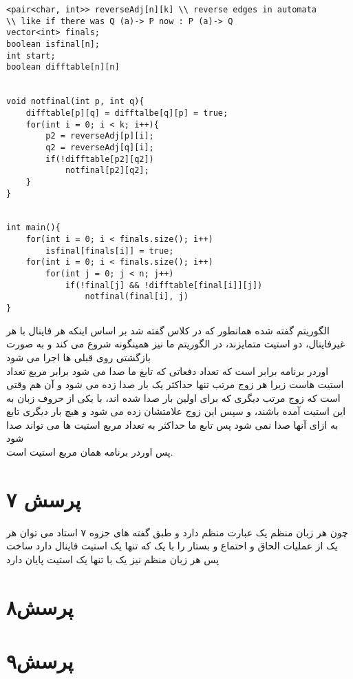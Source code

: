 \documentclass[a4paper]{article}
\begin{document}
	\lstset{ basicstyle=\footnotesize\tt, %
	captionpos=b, %
	extendedchars=true, %
	frame=single, %
	language=Java, %
	keywordstyle=\bf, 
	showspaces=false, %
	showtabs=false, %
tabsize=2 %
}
\begin{latin}
\begin{lstlisting}
<pair<char, int>> reverseAdj[n][k] \\ reverse edges in automata
\\ like if there was Q (a)-> P now : P (a)-> Q
vector<int> finals;
boolean isfinal[n];
int start;
boolean difftable[n][n]


void notfinal(int p, int q){
	difftable[p][q] = difftalbe[q][p] = true;
	for(int i = 0; i < k; i++){
		p2 = reverseAdj[p][i];
		q2 = reverseAdj[q][i];
		if(!difftable[p2][q2])
			notfinal[p2][q2];
	}
}


int main(){
	for(int i = 0; i < finals.size(); i++)
		isfinal[finals[i]] = true;
	for(int i = 0; i < finals.size(); i++)
		for(int j = 0; j < n; j++)
			if(!final[j] && !difftable[final[i]][j])
				notfinal(final[i], j)
}
\end{lstlisting}
\end{latin}
الگوریتم گفته شده همانطور که در کلاس گفته شد بر اساس اینکه هر فاینال با هر غیرفاینال، دو استیت متمایزند، در الگوریتم ما نیز همینگونه شروع می کند و به صورت بازگشتی روی قبلی ها اجرا می شود
\\
اوردر برنامه برابر
است که تعداد دفعاتی که تابغ ما صدا می شود برابر مربع تعداد استیت هاست زیرا هر زوج مرتب تنها حداکثر یک بار صدا زده می شود و آن هم وقتی است که زوج مرتب دیگری که برای اولین بار صدا شده اند، با یکی از حروف زبان به این استیت آمده باشند، و سپس این زوج علامتشان زده می شود و هیچ بار دیگری تابع به ازای آنها صدا نمی شود پس تابع ما حداکثر به تعداد مربع استیت ها می تواند صدا شود\\
پس اوردر برنامه همان مربع استیت است.
\pagebreak

\section*{پرسش ۷}
چون هر زبان منظم یک عبارت منظم دارد و طبق گفته های جزوه ۷ استاد می توان هر یک از عملیات الحاق و احتماع و بستار را با یک 
که تنها یک استیت فاینال دارد ساخت پس هر زبان منظم نیز یک
با تنها یک استیت پایان دارد
\pagebreak
\section*{پرسش۸}
\pagebreak
\section*{پرسش۹}
\end{document}

